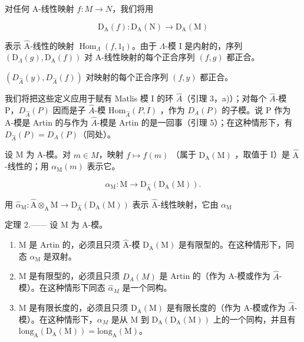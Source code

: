对任何 A-线性映射 \(f: M \rightarrow N\)，我们将用

\[
\mathrm{D} _ {\mathrm{A}} (f): \mathrm{D} _ {\mathrm{A}} (\mathrm{N}) \rightarrow \mathrm{D} _ {\mathrm{A}} (\mathrm{M})
\]

表示 \(\widehat{\mathrm{A}}\)-线性的映射 \(\operatorname{Hom}_{\Lambda}(f,1_{\mathrm{I}})\)。由于 \(\Lambda\)-模 I 是内射的，序列 \((\mathrm{D}_{\Lambda}(g),\mathrm{D}_{\mathrm{A}}(f))\) 对 A-线性映射的每个正合序列 \((f,g)\) 都正合。

\((D_{\hat{A}}(y), D_{\hat{A}}(f))\) 对映射的每个正合序列 \((f, y)\) 都正合。

我们将把这些定义应用于赋有 Matlis 模 I 的环 \(\hat{A}\)（引理 3，a)）；对每个 \(\hat{A}\)-模 P，\(D_{\hat{A}}(P)\) 因而是子 \(\hat{A}\)-模 \(\text{Hom}_{\hat{A}}(P, I)\) ，作为 \(D_{A}(P)\) 的子模。说 P 作为 A-模是 Artin 的与作为 \(\hat{A}\)-模是 Artin 的是一回事（引理 5）；在这种情形下，有 \(D_{\hat{A}}(P) = D_{A}(P)\)（同处）。

设 M 为 A-模。对 \(m \in M\)，映射 \(f \mapsto f(m)\) （属于 \(\mathrm{D}_{\mathrm{A}}(\mathrm{M})\) ，取值于 I）是 \(\widehat{\mathrm{A}}\) -线性的；用 \(\alpha_{\mathrm{M}}(m)\) 表示它。

\[
\alpha_ {\mathrm{M}}: \mathrm{M} \longrightarrow \mathrm{D} _ {\widehat {\mathrm{A}}} (\mathrm{D} _ {\mathrm{A}} (\mathrm{M})) .
\]

用 \(\widehat{\alpha}_{\mathrm{M}}:\widehat{\mathrm{A}}\otimes_{\mathrm{A}}\mathrm{M}\longrightarrow \mathrm{D}_{\widehat{\mathrm{A}}}(\mathrm{D}_{\mathrm{A}}(\mathrm{M}))\) 表示 \(\widehat{\mathrm{A}}\)-线性映射，它由 \(\alpha_{\mathrm{M}}\)

定理 2.—— 设 M 为 A-模。

\begin{enumerate}
\def\labelenumi{\alph{enumi})}
\item
  M 是 Artin 的，必须且只须 \(\hat{\mathrm{A}}\)-模 \(\mathrm{D}_{\mathrm{A}}(\mathrm{M})\) 是有限型的。在这种情形下，同态 \(\alpha_{\mathrm{M}}\) 是双射。
\item
  M 是有限型的，必须且只须 \(D_{A}(M)\) 是 Artin 的（作为 A-模或作为 \(\hat{A}\)-模）。在这种情形下同态 \(\hat{\alpha}_{M}\) 是一个同构。
\item
  M 是有限长度的，必须且只须 \(\mathrm{D}_{\mathrm{A}}(\mathrm{M})\) 是有限长度的（作为 A-模或作为 \(\widehat{A}\)-模）。在这种情形下，\(\alpha_{M}\) 是从 M 到 \(\mathrm{D}_{\mathrm{A}}(\mathrm{D}_{\mathrm{A}}(\mathrm{M}))\) 上的一个同构，并且有 \(\mathrm{long}_{\mathrm{A}}(\mathrm{D}_{\mathrm{A}}(\mathrm{M})) = \mathrm{long}_{\mathrm{A}}(\mathrm{M})\)。
\end{enumerate}

